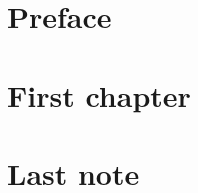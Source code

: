 \documentclass[twoside,a4paper]{book}
\begin{document}
\frontmatter

\maketitle

\chapter{Preface}

\mainmatter
\chapter{First chapter}


\backmatter
\chapter{Last note}
\end{document}
